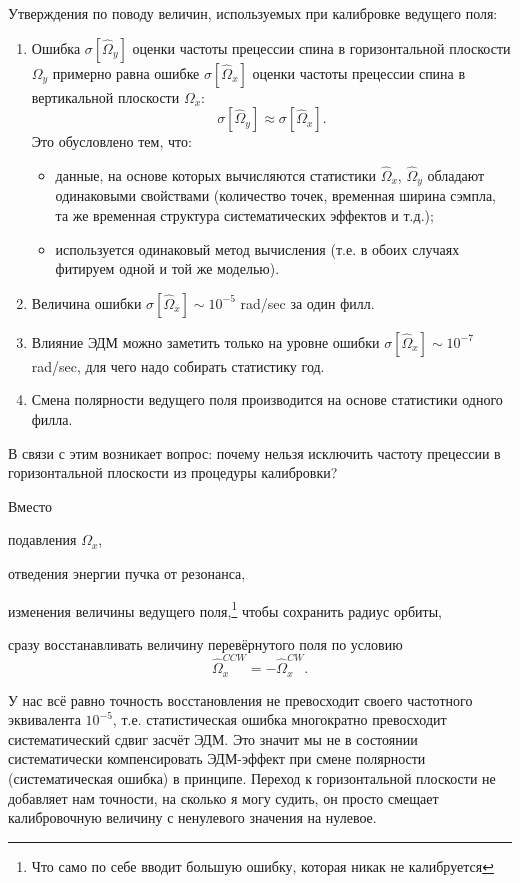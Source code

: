 \documentclass{article}
\newcommand{\SD}[1]{\sigma\left[{#1}\right]}
\newcommand{\W}{\Omega}
\begin{document}
Утверждения по поводу величин, используемых при калибровке ведущего поля:
\begin{enumerate}
\item Ошибка $\SD{\hat\W_y}$ оценки частоты прецессии спина в горизонтальной плоскости $\W_y$
  примерно равна ошибке $\SD{\hat\W_x}$ оценки частоты прецессии спина в вертикальной плоскости $\W_x$:
  \[\SD{\hat\W_y} \approx \SD{\hat\W_x}.\]
  Это обусловлено тем, что:
  \begin{itemize}
  \item данные, на основе которых вычисляются статистики $\hat\W_x$, $\hat\W_y$ обладают одинаковыми свойствами
    (количество точек, временная ширина сэмпла, та же временная структура систематических эффектов и т.д.);
  \item используется одинаковый метод вычисления (т.е. в обоих случаях фитируем одной и той же моделью).
  \end{itemize}
\item Величина ошибки $\SD{\hat\W_x} \sim 10^{-5}$ rad/sec за один филл.
\item Влияние ЭДМ можно заметить только на уровне ошибки $\SD{\hat\W_x}\sim 10^{-7}$ rad/sec,
  для чего надо собирать статистику год.
\item Смена полярности ведущего поля производится на основе статистики одного филла.
\end{enumerate}

В связи с этим возникает вопрос: почему нельзя исключить частоту прецессии в горизонтальной плоскости
из процедуры калибровки?

Вместо
\begin{inparaenum}[(1)]
\item подавления $\W_x$,
\item отведения энергии пучка от резонанса,
\item изменения величины ведущего поля,\footnote{Что само по себе вводит большую ошибку,
  которая никак не калибруется} чтобы сохранить радиус орбиты,
\end{inparaenum}
сразу восстанавливать величину перевёрнутого поля по условию
\[
\hat\W_x^{CCW} = -\hat\W_x^{CW}.
\]

У нас всё равно точность восстановления не превосходит своего частотного эквивалента $10^{-5}$,
т.е. статистическая ошибка многократно превосходит систематический сдвиг засчёт ЭДМ.
Это значит мы не в состоянии систематически компенсировать ЭДМ-эффект при смене полярности
(систематическая ошибка) в принципе. Переход к горизонтальной плоскости не добавляет нам точности,
на сколько я могу судить, он просто смещает калибровочную величину с ненулевого значения на нулевое.
\end{document}
